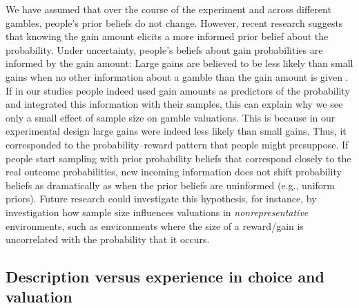 \documentclass[a4paper, man, natbib, floatsintext]{apa6}
\begin{document}
We have assumed that over the course of the experiment and across different gambles, people's prior beliefs do not change. However, recent research suggests that knowing the gain amount elicits a more informed prior belief about the probability. Under uncertainty, people's beliefs about gain probabilities are informed by the gain amount: Large gains are believed to be less likely than small gains when no other information about a gamble than the gain amount is given \citep{Pleskac2014, Hoffart2018}. If in our studies people indeed used gain amounts as predictors of the probability and integrated this information with their samples, this can explain why we see only a small effect of sample size on gamble valuations. This is because in our experimental design large gains were indeed less likely than small gains. Thus, it corresponded to the probability--reward pattern that people might presuppose. If people start sampling with prior probability beliefs that correspond closely to the real outcome probabilities, new incoming information does not shift probability beliefs as dramatically as when the prior beliefs are uninformed (e.g., uniform priors). Future research could investigate this hypothesis, for instance, by investigation how sample size influences valuations in \textit{nonrepresentative} environments, such as environments where the size of a reward/gain is uncorrelated with the probability that it occurs.

\subsection{Description versus experience in choice and valuation}
\end{document}
